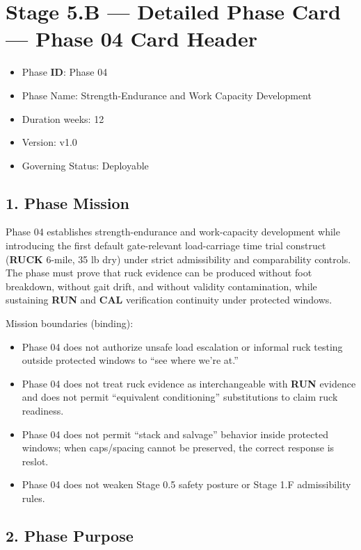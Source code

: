 \documentclass[10pt]{article}
\begin{document}
\section*{Stage 5.B — Detailed Phase Card — Phase 04 Card Header}
{}

\begin{itemize}
\item Phase \textbf{ID}: Phase 04
\item Phase Name: Strength-Endurance and Work Capacity Development
\item Duration weeks: 12
\item Version: v1.0
\item Governing Status: Deployable
\end{itemize}

\subsection*{1. Phase Mission}


Phase 04 establishes strength-endurance and work-capacity development while introducing the first default gate-relevant load-carriage time trial construct (\textbf{RUCK} 6-mile, 35 lb dry) under strict admissibility and comparability controls. The phase must prove that ruck evidence can be produced without foot breakdown, without gait drift, and without validity contamination, while sustaining \textbf{RUN} and \textbf{CAL} verification continuity under protected windows.

Mission boundaries (binding):

\begin{itemize}
\item Phase 04 does not authorize unsafe load escalation or informal ruck testing outside protected windows to “see where we’re at.”
\item Phase 04 does not treat ruck evidence as interchangeable with \textbf{RUN} evidence and does not permit “equivalent conditioning” substitutions to claim ruck readiness.
\item Phase 04 does not permit “stack and salvage” behavior inside protected windows; when caps/spacing cannot be preserved, the correct response is reslot.
\item Phase 04 does not weaken Stage 0.5 safety posture or Stage 1.F admissibility rules.
\end{itemize}

\subsection*{2. Phase Purpose}
\end{document}
